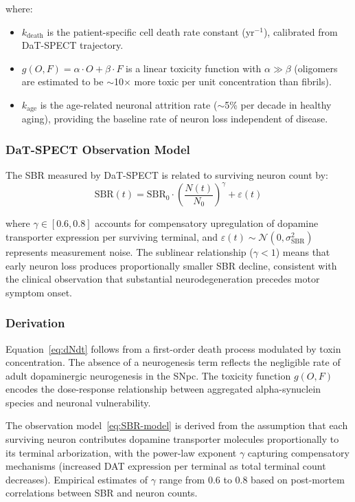 where:
\begin{itemize}
\item $k_\text{death}$ is the patient-specific cell death rate constant (yr$^{-1}$), calibrated from DaT-SPECT trajectory.
\item $g(O, F) = \alpha \cdot O + \beta \cdot F$ is a linear toxicity function with $\alpha \gg \beta$ (oligomers are estimated to be $\sim$10$\times$ more toxic per unit concentration than fibrils).
\item $k_\text{age}$ is the age-related neuronal attrition rate ($\sim$5\% per decade in healthy aging), providing the baseline rate of neuron loss independent of disease.
\end{itemize}

\subsubsection{DaT-SPECT Observation Model}

The SBR measured by DaT-SPECT is related to surviving neuron count by:
\begin{equation}
\text{SBR}(t) = \text{SBR}_0 \cdot \left(\frac{N(t)}{N_0}\right)^\gamma + \varepsilon(t)
\label{eq:SBR-model}
\end{equation}

where $\gamma \in [0.6, 0.8]$ accounts for compensatory upregulation of dopamine transporter expression per surviving terminal, and $\varepsilon(t) \sim \mathcal{N}(0, \sigma_\text{SBR}^2)$ represents measurement noise. The sublinear relationship ($\gamma < 1$) means that early neuron loss produces proportionally smaller SBR decline, consistent with the clinical observation that substantial neurodegeneration precedes motor symptom onset.

\subsubsection{Derivation}

Equation~\eqref{eq:dNdt} follows from a first-order death process modulated by toxin concentration. The absence of a neurogenesis term reflects the negligible rate of adult dopaminergic neurogenesis in the SNpc. The toxicity function $g(O, F)$ encodes the dose-response relationship between aggregated alpha-synuclein species and neuronal vulnerability.

The observation model~\eqref{eq:SBR-model} is derived from the assumption that each surviving neuron contributes dopamine transporter molecules proportionally to its terminal arborization, with the power-law exponent $\gamma$ capturing compensatory mechanisms (increased DAT expression per terminal as total terminal count decreases). Empirical estimates of $\gamma$ range from 0.6 to 0.8 based on post-mortem correlations between SBR and neuron counts.

